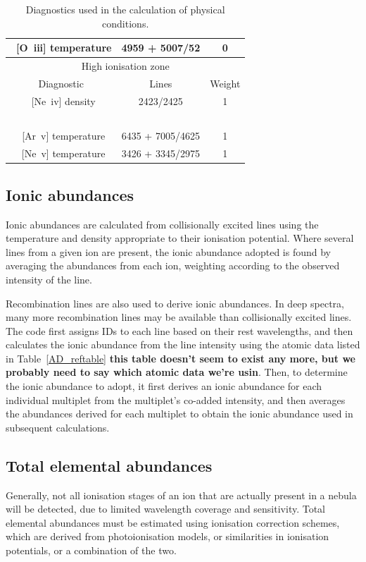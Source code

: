 \documentclass[useAMS,usenatbib]{mn2e}
\begin{document}
\begin{table}
\begin{tabular}{ccc}
~[O~{\sc iii}] temperature &4959 + 5007/52 & 0\\
\hline
\multicolumn{3}{c}{High ionisation zone}\\
\hline
Diagnostic & Lines & Weight \\
~[Ne~{\sc iv}] density & 2423/2425 & 1 \\
~\\
~[Ar~{\sc v}] temperature & 6435 + 7005/4625& 1 \\
~[Ne~{\sc v}] temperature & 3426 + 3345/2975 & 1 \\
\end{tabular}
\label{zonestable}
\caption{Diagnostics used in the calculation of physical conditions.}
\end{table}

\subsection{Ionic abundances}

Ionic abundances are calculated from collisionally excited lines using the temperature and density appropriate to their ionisation potential.  Where several lines from a given ion are present, the ionic abundance adopted is found by averaging the abundances from each ion, weighting according to the observed intensity of the line.

Recombination lines are also used to derive ionic abundances.  In deep spectra, many more recombination lines may be available than collisionally excited lines.  The code first assigns IDs to each line based on their rest wavelengths, and then calculates the ionic abundance from the line intensity using the atomic data listed in Table~\ref{AD_reftable} \textbf{this table doesn't seem to exist any more, but we probably need to say which atomic data we're usin}.  Then, to determine the ionic abundance to adopt, it first derives an ionic abundance for each individual multiplet from the multiplet's co-added intensity, and then averages the abundances derived for each multiplet to obtain the ionic abundance used in subsequent calculations.

\subsection{Total elemental abundances}

Generally, not all ionisation stages of an ion that are actually present in a nebula will be detected, due to limited wavelength coverage and sensitivity.  Total elemental abundances must be estimated using ionisation correction schemes, which are derived from photoionisation models, or similarities in ionisation potentials, or a combination of the two.
\end{document}
